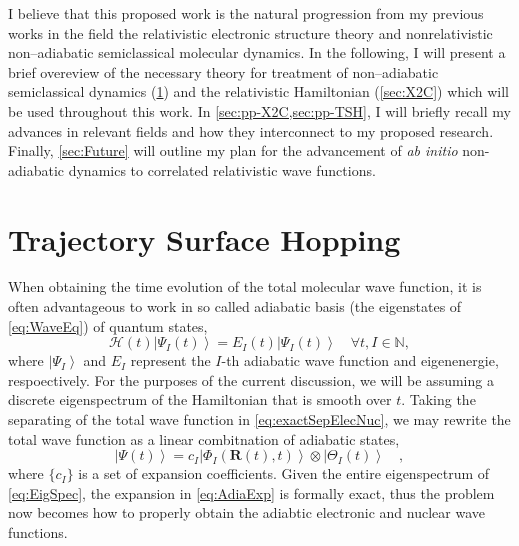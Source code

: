 \documentclass[12pt]{article}
\newcommand{\ket}[1]{\left\vert #1 \right\rangle}         %
\newcommand*\vc[1]{\boldsymbol{#1}}
\newcommand*\op[1]{\mathcal{#1}}
\begin{document}


I believe that this proposed work is the natural progression from my previous
works in the field the relativistic electronic structure
theory\cite{DBWY16_Accepted1} and nonrelativistic non--adiabatic semiclassical
molecular dynamics.\cite{DBWY16_JCTC935,DBWY16_Submitted1} In the following, I
will present a brief overeview of the necessary theory for treatment of
non--adiabatic semiclassical dynamics (\cref{sec:TSH}) and the relativistic
Hamiltonian (\cref{sec:X2C}) which will be used throughout this work.
In \cref{sec:pp-X2C,sec:pp-TSH}, I will briefly recall my advances in relevant
fields and how they interconnect to my proposed research.  Finally,
\cref{sec:Future} will outline my plan for the advancement of \emph{ab initio}
non-adiabatic dynamics to correlated relativistic wave functions.


\section{Trajectory Surface Hopping}
\label{sec:TSH}

When obtaining the time evolution of the total molecular wave function, it is
often advantageous to work in so called adiabatic basis (the eigenstates of
\cref{eq:WaveEq}) of quantum states,
\begin{equation}
\op{H}(t) \ket{\Psi_I (t)} = E_I(t) \ket{\Psi_I (t)}
\quad \forall t, I \in \mathbb{N},
\label{eq:EigSpec}
\end{equation}
where $\ket{\Psi_I}$ and $E_I$ represent the $I$-th adiabatic wave function and
eigenenergie, respoectively. For the purposes of the current discussion, we will
be assuming a discrete eigenspectrum of the Hamiltonian that is smooth over $t$.
Taking the separating of the total wave function in \cref{eq:exactSepElecNuc},
we may rewrite the total wave function as a linear combitnation of adiabatic
states,
\begin{equation}
\ket{\Psi (t)} = c_I \ket{\Phi_I (\vc{R}(t),t)} \otimes \ket{\Theta_I (t)}
\quad ,
\label{eq:AdiaExp}
\end{equation}
where $\{ c_I \}$ is a set of expansion coefficients.  Given the entire
eigenspectrum of \cref{eq:EigSpec}, the expansion in \cref{eq:AdiaExp} is
formally exact, thus the problem now becomes how to properly obtain the adiabtic
electronic and nuclear wave functions.
\end{document}
